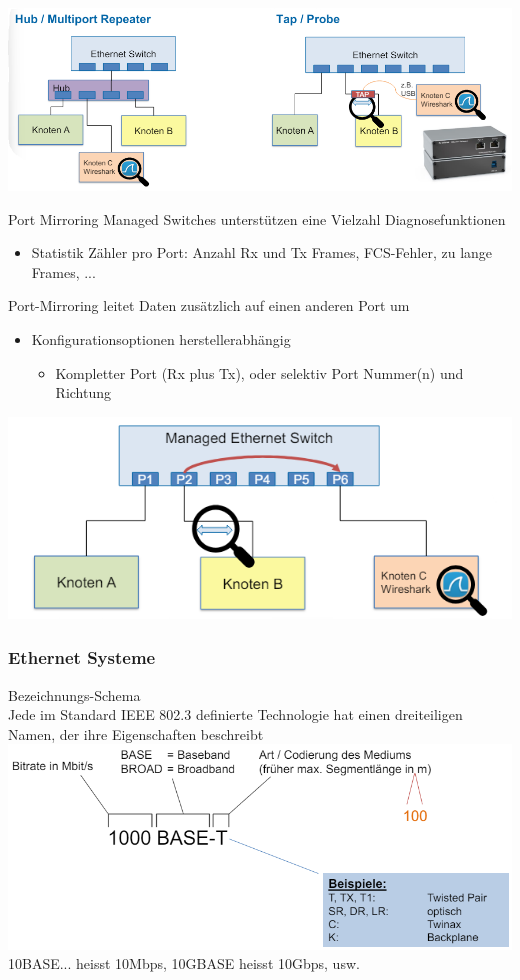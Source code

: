 \includegraphics[width=1\linewidth]{images/switched_lan_monitoring.png}

\begin{concept}{Port Mirroring}
    Managed Switches unterstützen eine Vielzahl Diagnosefunktionen
    \begin{itemize}
        \item Statistik Zähler pro Port: Anzahl Rx und Tx Frames, FCS-Fehler, zu lange Frames, ...
    \end{itemize}
    Port-Mirroring leitet Daten zusätzlich auf einen anderen Port um
    \begin{itemize}
        \item Konfigurationsoptionen herstellerabhängig
        \begin{itemize}
            \item Kompletter Port (Rx plus Tx), oder selektiv Port Nummer(n) und Richtung
        \end{itemize}
    \end{itemize}
        \includegraphics[width=0.6\linewidth]{images/port_mirroring.png}
\end{concept}

\subsubsection{Ethernet Systeme}

\begin{theorem}{Bezeichnungs-Schema}\\
    Jede im Standard IEEE 802.3 definierte Technologie hat einen dreiteiligen Namen, der ihre Eigenschaften beschreibt\\
    \includegraphics[width=0.9\linewidth]{images/ethernet_bezeichnungsschema.png}\\
    10BASE... heisst 10Mbps, 10GBASE heisst 10Gbps, usw.
\end{theorem}

